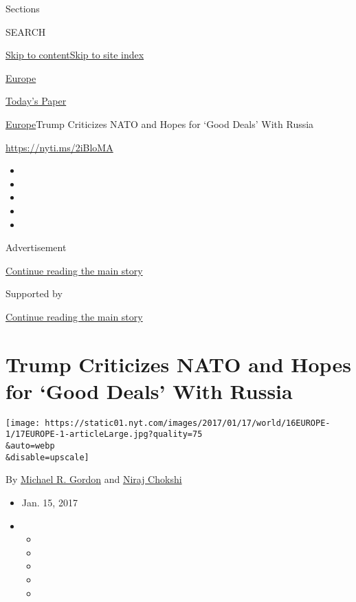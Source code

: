 Sections

SEARCH

\protect\hyperlink{site-content}{Skip to
content}\protect\hyperlink{site-index}{Skip to site index}

\href{https://www.nytimes.com/section/world/europe}{Europe}

\href{https://myaccount.nytimes.com/auth/login?response_type=cookie\&client_id=vi}{}

\href{https://www.nytimes.com/section/todayspaper}{Today's Paper}

\href{/section/world/europe}{Europe}\textbar{}Trump Criticizes NATO and
Hopes for `Good Deals' With Russia

\url{https://nyti.ms/2iBloMA}

\begin{itemize}
\item
\item
\item
\item
\item
\end{itemize}

Advertisement

\protect\hyperlink{after-top}{Continue reading the main story}

Supported by

\protect\hyperlink{after-sponsor}{Continue reading the main story}

\hypertarget{trump-criticizes-nato-and-hopes-for-good-deals-with-russia}{%
\section{Trump Criticizes NATO and Hopes for `Good Deals' With
Russia}\label{trump-criticizes-nato-and-hopes-for-good-deals-with-russia}}

\texttt{[image: https://static01.nyt.com/images/2017/01/17/world/16EUROPE-1/17EUROPE-1-articleLarge.jpg?quality=75\\\&auto=webp\\\&disable=upscale]}

By \href{http://www.nytimes.com/by/michael-r-gordon}{Michael R. Gordon}
and \href{http://www.nytimes.com/by/niraj-chokshi}{Niraj Chokshi}

\begin{itemize}
\item
  Jan. 15, 2017
\item
  \begin{itemize}
  \item
  \item
  \item
  \item
  \item
  \end{itemize}
\end{itemize}

